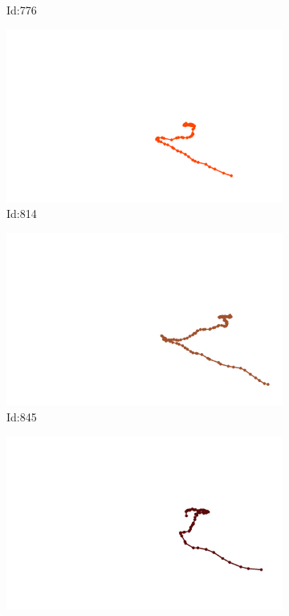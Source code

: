 \documentclass[12pt,twoside]{report}
\begin{document}
\begin{figure}
\begin{subfigure}[b]{0.20\textwidth}
\caption{Id:776}
\end{subfigure}
\begin{subfigure}[b]{0.20\textwidth}
\centering
\includegraphics[width=\textwidth]{../trajectories/814.png}
\caption{Id:814}
\end{subfigure}
\begin{subfigure}[b]{0.20\textwidth}
\centering
\includegraphics[width=\textwidth]{../trajectories/845.png}
\caption{Id:845}
\end{subfigure}
\begin{subfigure}[b]{0.20\textwidth}
\centering
\includegraphics[width=\textwidth]{../trajectories/911.png}

\end{subfigure}
\end{figure}
\end{document}
